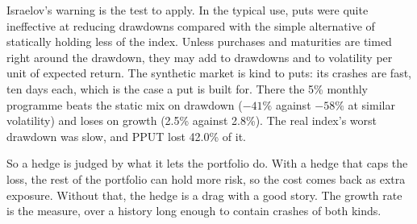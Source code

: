 Israelov's warning is the test to apply. In the typical use, puts were quite ineffective at reducing drawdowns compared with the simple alternative
of statically holding less of the index. Unless purchases and maturities are timed right around the drawdown, they may add to drawdowns and to
volatility per unit of expected return. The synthetic market is kind to puts: its crashes are fast, ten days each, which is the case a put is built
for. There the 5\% monthly programme beats the static mix on drawdown ($-41\%$ against $-58\%$ at similar volatility) and loses on growth (2.5\% against
2.8\%). The real index's worst drawdown was slow, and PPUT lost 42.0\% of it.

So a hedge is judged by what it lets the portfolio do. With a hedge that caps the loss, the rest of the portfolio can hold more risk, so the cost
comes back as extra exposure. Without that, the hedge is a drag with a good story. The growth rate is the measure, over a history long enough to
contain crashes of both kinds.

\begin{omfigure}

\label{fig:s2:tail-hedging-and-long-volatility:paths}
\end{omfigure}

